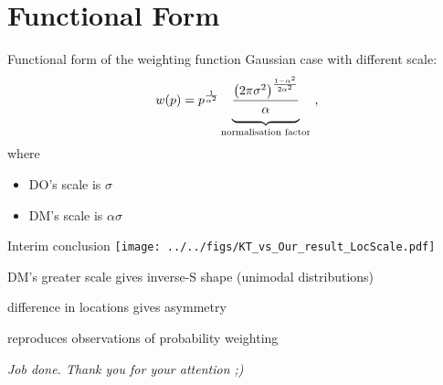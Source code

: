 \section{Functional Form}
\begin{frame}{Functional form of the weighting function}
Gaussian case with different scale:
\begin{equation}
	w(p) =
	p^{\frac{1}{\alpha^2}}
	\underbrace{
	\frac{\left(2\pi\sigma^2\right)^{\frac{1-\alpha^2}{2\alpha^2}}}{\alpha\strut}
	}_{\text{normalisation factor}}
	~,
\end{equation}
where
\begin{itemize}
  \item DO's scale is $\sigma$
  \item DM's scale is $\alpha\sigma$
\end{itemize}
\end{frame}




\begin{frame}{Interim conclusion}
\label{InterimConclusion}
\centering \texttt{[image: ../../figs/KT\_vs\_Our\_result\_LocScale.pdf]}

\bi
	\item DM's greater scale gives inverse-S shape (unimodal distributions)
	\item difference in locations gives asymmetry
	\item reproduces observations of probability weighting
	\item[]
	\item[] \textit{Job done. Thank you for your attention ;)}
\ei
\end{frame}

